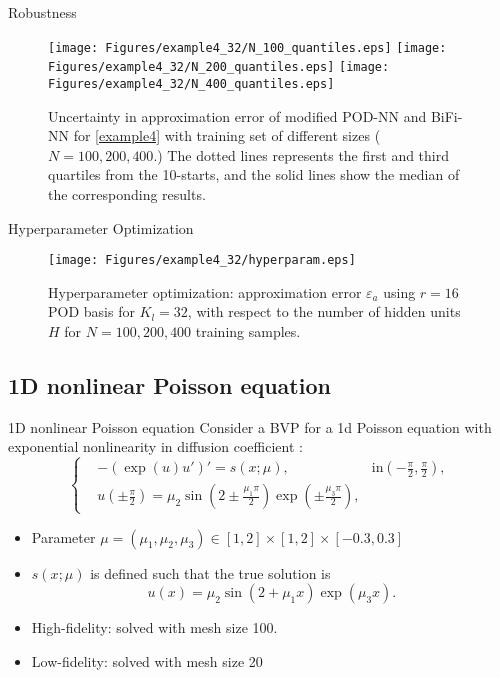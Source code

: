 \documentclass[10pt]{beamer}
\begin{document}
\begin{frame}{Robustness}
\begin{figure}[ht]
    \centering
    \vbox{
    \texttt{[image: Figures/example4\_32/N\_100\_quantiles.eps]}
    \texttt{[image: Figures/example4\_32/N\_200\_quantiles.eps]}
    \texttt{[image: Figures/example4\_32/N\_400\_quantiles.eps]}
    }
    \caption{Uncertainty in approximation error of modified POD-NN and BiFi-NN for \eqref{example4} with training set of different sizes ($N = 100, 200, 400$.) The dotted lines represents the first and third quartiles from the 10-starts, and the solid lines show the median of the corresponding results.}
    \label{example4-quantiles}
\end{figure}
\end{frame}

\begin{frame}{Hyperparameter Optimization}
\begin{figure}[htbp]
\centering
\vbox{
\texttt{[image: Figures/example4\_32/hyperparam.eps]}
}
\caption{Hyperparameter optimization: approximation error $\varepsilon_a$ using $r = 16 $ POD basis for $K_l = 32$, with respect to the number of hidden units $H$ for $N=100, 200, 400$ training samples.}
\label{example4-hyperopt}
\end{figure}
\end{frame}


\subsection{1D nonlinear Poisson equation}

\begin{frame}{1D nonlinear Poisson equation}
Consider a BVP for a 1d Poisson equation with exponential nonlinearity in diffusion coefficient \cite{hesthaven2018non}:
\begin{equation}
    \label{example_epfl}
    \left\{
    \begin{aligned}
    &-(\exp(u) u')' = s(x; \mu), \quad & \text{in} \left(-\frac{\pi}{2}, \frac{\pi}{2}\right), \\
    &u\left(\pm\frac{\pi}{2}\right) = \mu_2 \sin\left(2\pm\frac{\mu_1\pi}{2}\right)\exp\left(\pm\frac{\mu_3\pi}{2}\right),
    \end{aligned}
    \right.
\end{equation}
\begin{itemize}
\item Parameter $\mu = (\mu_1, \mu_2, \mu_3) \in [1, 2]\times [1, 2]\times[-0.3, 0.3]$
\item $s(x; \mu)$ is defined such that the true solution is
$$
u(x) = \mu_2\sin(2+\mu_1 x)\exp(\mu_3 x).
$$
\item High-fidelity: solved with mesh size 100.
\item Low-fidelity: solved with mesh size 20
\end{itemize}
\end{frame}
\end{document}
